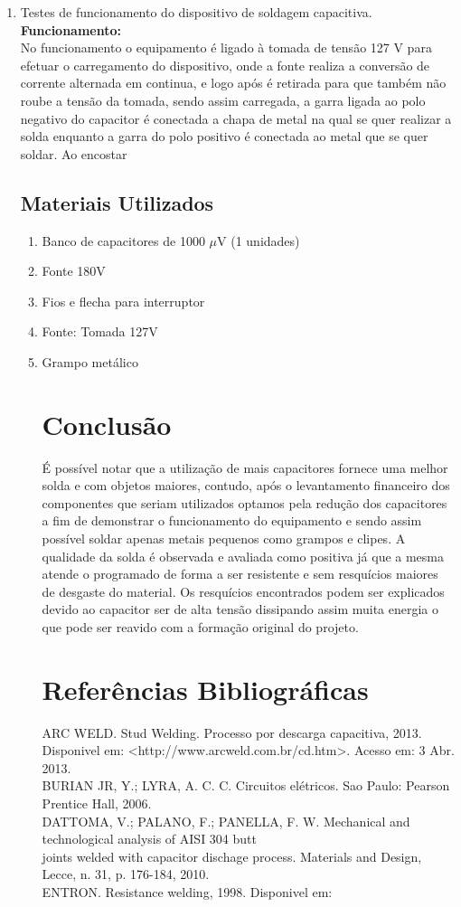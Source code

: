 \documentclass[a4paper,12pt]{article}%
\begin{document}
\begin{enumerate}
	 
	 \item Testes de funcionamento do dispositivo de soldagem capacitiva.\\
	 \textbf{Funcionamento:}\\
	 No funcionamento o equipamento é ligado à tomada de tensão 127 V para efetuar o carregamento do dispositivo, onde a fonte realiza a conversão de corrente alternada em continua, e logo após é retirada para que também não roube a tensão da tomada, sendo assim carregada, a garra ligada ao polo negativo do capacitor é conectada a chapa de metal na qual se quer realizar a solda enquanto a garra do polo positivo é conectada ao metal que se quer soldar. Ao encostar 
	\subsection{Materiais Utilizados}
	\begin{enumerate}
		\setcounter{enumi}{0}
		\item Banco de capacitores de 1000 $\mu$V (1 unidades)
		\item Fonte 180V
		\item Fios e flecha para interruptor
		\item Fonte: Tomada 127V
		\item Grampo metálico
		\setcounter{enumi}{0}
		\pagebreak
		
		\section{Conclusão}
		É possível notar que a utilização de mais capacitores fornece uma melhor solda e com objetos maiores, contudo, após o levantamento financeiro dos componentes que seriam utilizados optamos pela redução dos capacitores a fim de demonstrar o funcionamento do equipamento e sendo assim possível soldar apenas metais pequenos como grampos e clipes.
		A qualidade da solda é observada e avaliada como positiva já que a mesma atende o programado de forma a ser resistente e sem resquícios maiores de desgaste do material. Os resquícios encontrados podem ser explicados devido ao capacitor ser de alta tensão dissipando assim muita energia o que pode ser reavido com a formação original do projeto. 
		\pagebreak
		
		\section{Referências Bibliográficas}
		ARC WELD. Stud Welding. Processo por descarga capacitiva, 2013. Disponivel em:
		<http://www.arcweld.com.br/cd.htm>. Acesso em: 3 Abr. 2013.\\
		BURIAN JR, Y.; LYRA, A. C. C. Circuitos elétricos. Sao Paulo: Pearson Prentice Hall, 2006.\\
		DATTOMA, V.; PALANO, F.; PANELLA, F. W. Mechanical and technological analysis of AISI 304 butt\\
		joints welded with capacitor dischage process. Materials and Design, Lecce, n. 31, p. 176-184, 2010.\\
		ENTRON. Resistance welding, 1998. Disponivel em:\\
	

\end{enumerate}
\end{enumerate}
\end{document}
